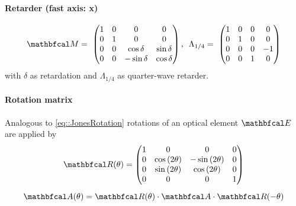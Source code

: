 \paragraph{Retarder (fast axis: x)}
\begin{align}
\mat{M}=\
\begin{pmatrix}
    1 & 0 & 0 &  0 \\
    0 & 1 & 0 &  0 \\
    0 & 0 & \cos \delta & \sin \delta \\
    0 & 0 & -\sin \delta &  \cos \delta
\end{pmatrix}
, \enspace
%
\Lambda_{1/4}=\
\begin{pmatrix}
    1 & 0 & 0 &  0 \\
    0 & 1 & 0 &  0 \\
    0 & 0 & 0 & -1 \\
    0 & 0 & 1 &  0
\end{pmatrix}
\end{align}
with $\delta$ as retardation and $\Lambda_{1/4}$ as quarter-wave retarder.
%
\paragraph{Rotation matrix}
Analogous to \cref{eq::JonesRotation} rotations of an optical element $\mat{E}$ are applied by
\begin{align}
\centering
\begin{gathered}
\mat{R}(\theta)=
\begin{pmatrix}
    1 &                0 &               0 & 0 \\
    0 & \cos{(2\theta)} & -\sin{(2\theta)} & 0 \\
    0 & \sin{(2\theta)} & \cos{(2\theta)} & 0 \\
    0 &                0 &               0 & 1
\end{pmatrix} \\[0.5em]
\mat{A}(\theta)
=\mat{R}(\theta )\cdot\mat{A}\cdot\mat{R}(-\theta )
\end{gathered}
\end{align}